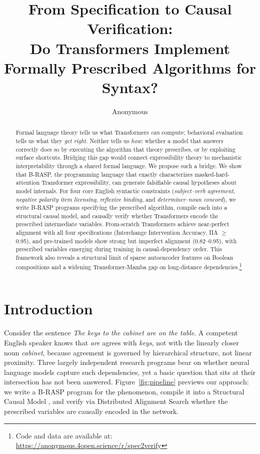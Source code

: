 \documentclass[11pt]{article}
\title{From Specification to Causal Verification:\\ Do Transformers Implement Formally Prescribed Algorithms for Syntax?}
\author{Anonymous}
\begin{document}
\maketitle

\begin{abstract}
Formal language theory tells us what Transformers \emph{can} compute; behavioral evaluation tells us what they \emph{get right}.
Neither tells us \emph{how}: whether a model that answers correctly does so by executing the algorithm that theory prescribes, or by exploiting surface shortcuts.
Bridging this gap would connect expressibility theory to mechanistic interpretability through a shared formal language.
%
We propose such a bridge.
We show that B-RASP, the programming language that exactly characterizes masked-hard-attention Transformer expressibility, can generate falsifiable causal hypotheses about model internals.
For four core English syntactic constraints (\textit{subject--verb agreement}, \textit{negative polarity item licensing}, \textit{reflexive binding}, and \textit{determiner--noun concord}), we write B-RASP programs specifying the prescribed algorithm, compile each into a structural causal model, and causally verify whether Transformers encode the prescribed intermediate variables.
%
From-scratch Transformers achieve near-perfect alignment with all four specifications (Interchange Intervention Accuracy, IIA $\geq$ 0.95), and pre-trained models show strong but imperfect alignment (0.82--0.95), with prescribed variables emerging during training in causal-dependency order.
This framework also reveals a structural limit of sparse autoencoder features on Boolean compositions and a widening Transformer-Mamba gap on long-distance dependencies.\footnote{Code and data are available at: \url{https://anonymous.4open.science/r/spec2verify}}
\end{abstract}

\section{Introduction}
\label{sec:intro}

Consider the sentence \textit{The keys to the cabinet are on the table}.
A competent English speaker knows that \textit{are} agrees with \textit{keys}, not with the linearly closer noun \textit{cabinet}, because agreement is governed by hierarchical structure, not linear proximity.
Three largely independent research programs bear on whether neural language models capture such dependencies, yet a basic question that sits at their intersection has not been answered.
Figure~\ref{fig:pipeline} previews our approach: we write a B-RASP program \citep{DBLP:conf/nips/Yang0A24} for the phenomenon, compile it into a Structural Causal Model \citep[SCM;][]{pearl2009causality}, and verify via Distributed Alignment Search \citep[DAS;][]{DBLP:conf/clear2/GeigerWPIG24} whether the prescribed variables are causally encoded in the network.
\end{document}
